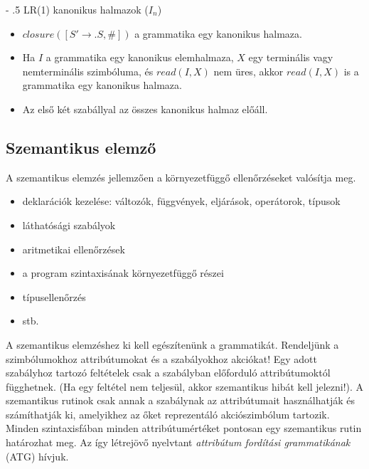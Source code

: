 \documentclass[margin=0px]{article}
\makeatletter
\renewcommand\paragraph{%
    \@startsection{paragraph}{4}{0mm}%
    {-\baselineskip}%
    {.5\baselineskip}%
    {\normalfont\normalsize\bfseries}}
\makeatother
\begin{document}
\paragraph{LR(1) kanonikus halmazok ($ I_n $)}
\begin{itemize}
    \item
          $ closure([S' \rightarrow .S, \#]) $ a grammatika egy kanonikus halmaza.
    \item
          Ha $ I $ a grammatika egy kanonikus elemhalmaza, $ X $ egy terminális vagy nemterminális szimbóluma, és $ read(I, X) $ nem üres, akkor $ read(I, X) $ is a grammatika egy kanonikus halmaza.
    \item
          Az első két szabállyal az összes kanonikus halmaz előáll.
\end{itemize}




\subsection{Szemantikus elemző}


A szemantikus elemzés jellemzően a környezetfüggő ellenőrzéseket
valósítja meg.

\begin{itemize}
    \item
          deklarációk kezelése: változók, függvények, eljárások, operátorok, 	típusok
    \item
          láthatósági szabályok
    \item
          aritmetikai ellenőrzések
    \item
          a program szintaxisának környezetfüggő részei
    \item
          típusellenőrzés
    \item
          stb.
\end{itemize}


A szemantikus elemzéshez ki kell egészítenünk a grammatikát. Rendeljünk a szimbólumokhoz attribútumokat és a szabályokhoz akciókat! Egy adott szabályhoz tartozó feltételek csak a szabályban	előforduló attribútumoktól függhetnek.	(Ha egy feltétel nem teljesül, akkor szemantikus hibát kell	jelezni!). A szemantikus rutinok csak annak a szabálynak az	attribútumait használhatják és számíthatják ki, amelyikhez az őket reprezentáló akciószimbólum tartozik. Minden szintaxisfában minden attribútumértéket pontosan egy
szemantikus rutin határozhat meg. Az így létrejövő nyelvtant \textit{attribútum fordítási grammatikának} (ATG) hívjuk.
\end{document}
